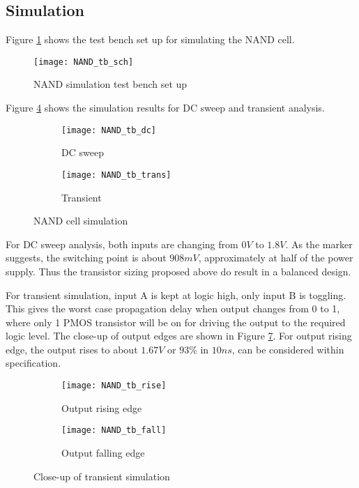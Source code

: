 \subsection{Simulation}

Figure \ref{fig:nand_tb_sch} shows the test bench set up for simulating the NAND cell.

\begin{figure}[!htb]
	\centering
	\texttt{[image: NAND\_tb\_sch]}
	\caption{NAND simulation test bench set up}
	\label{fig:nand_tb_sch}
\end{figure}

Figure \ref{fig:nand_tb_sim} shows the simulation results for DC sweep and transient analysis.

\begin{figure}[!htb]
	\centering
	\begin{subfigure}[b]{0.45\textwidth}
		\texttt{[image: NAND\_tb\_dc]}
		\caption{DC sweep}
		\label{fig:nand_tb_dc}
	\end{subfigure}
	\begin{subfigure}[b]{0.45\textwidth}
		\texttt{[image: NAND\_tb\_trans]}
		\caption{Transient}
		\label{fig:nand_tb_trans}
	\end{subfigure}
	\caption{NAND cell simulation}
	\label{fig:nand_tb_sim}
\end{figure}

For DC sweep analysis, both inputs are changing from $0 V$ to $1.8 V$. As the marker suggests, the switching point is about $908 mV$, approximately at half of the power supply. Thus the transistor sizing proposed above do result in a balanced design.

For transient simulation, input A is kept at logic high, only input B is toggling. This gives the worst case propagation delay when output changes from 0 to 1, where only 1 PMOS transistor will be on for driving the output to the required logic level. The close-up of output edges are shown in Figure \ref{fig:nand_tb_edges}. For output rising edge, the output rises to about $1.67 V$ or $93 \%$ in $10 ns$, can be considered within specification.

\begin{figure}[!htb]
	\centering
	\begin{subfigure}[b]{0.45\textwidth}
		\texttt{[image: NAND\_tb\_rise]}
		\caption{Output rising edge}
		\label{fig:nand_tb_rise}
	\end{subfigure}
	\begin{subfigure}[b]{0.45\textwidth}
		\texttt{[image: NAND\_tb\_fall]}
		\caption{Output falling edge}
		\label{fig:nand_tb_fall}
	\end{subfigure}
	\caption{Close-up of transient simulation}
	\label{fig:nand_tb_edges}
\end{figure}

